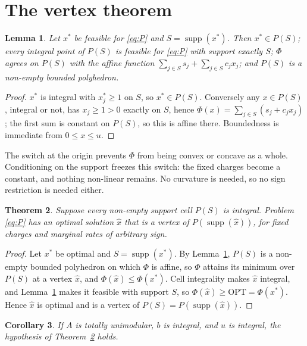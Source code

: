 \documentclass[3p,11pt]{elsarticle}
\newtheorem{theorem}{Theorem}
\newtheorem{lemma}[theorem]{Lemma}
\newtheorem{corollary}[theorem]{Corollary}
\theoremstyle{remark}
\theoremstyle{definition}
\newcommand{\supp}{\operatorname{supp}}
\newcommand{\OPT}{\mathrm{OPT}}
\begin{document}
\section{The vertex theorem}

\begin{lemma}\label{lem:cell}
Let $x^{*}$ be feasible for \eqref{eq:P} and $S=\supp(x^{*})$. Then $x^{*}\in P(S)$;
every integral point of $P(S)$ is feasible for \eqref{eq:P} with support exactly $S$;
$\Phi$ agrees on $P(S)$ with the affine function $\sum_{j\in S}s_j+\sum_{j\in S}c_jx_j$;
and $P(S)$ is a non-empty bounded polyhedron.
\end{lemma}

\begin{proof}
$x^{*}$ is integral with $x^{*}_j\ge1$ on $S$, so $x^{*}\in P(S)$. Conversely any
$x\in P(S)$, integral or not, has $x_j\ge1>0$ exactly on $S$, hence
$\Phi(x)=\sum_{j\in S}(s_j+c_jx_j)$; the first sum is constant on $P(S)$, so this is
affine there. Boundedness is immediate from $0\le x\le u$.
\end{proof}

The switch at the origin prevents $\Phi$ from being convex or concave as a whole.
Conditioning on the support freezes this switch: the fixed charges become a constant,
and nothing non-linear remains. No curvature is needed, so no sign
restriction is needed either.

\begin{theorem}\label{thm:main}
Suppose every non-empty support cell $P(S)$ is integral. Problem \eqref{eq:P} has an
optimal solution $\hat x$ that is a vertex of $P(\supp(\hat x))$, for fixed charges and
marginal rates of arbitrary sign.
\end{theorem}

\begin{proof}
Let $x^{*}$ be optimal and $S=\supp(x^{*})$. By Lemma~\ref{lem:cell}, $P(S)$ is a
non-empty bounded polyhedron on which $\Phi$ is affine, so $\Phi$ attains its minimum
over $P(S)$ at a vertex $\hat x$, and $\Phi(\hat x)\le\Phi(x^{*})$. Cell integrality
makes $\hat x$ integral, and Lemma~\ref{lem:cell} makes it feasible with support $S$, so
$\Phi(\hat x)\ge\OPT=\Phi(x^{*})$. Hence $\hat x$ is optimal and is a vertex of
$P(S)=P(\supp(\hat x))$.
\end{proof}

\begin{corollary}\label{cor:tu}
If $A$ is totally unimodular, $b$ is integral, and $u$ is integral, the hypothesis of
Theorem~\ref{thm:main} holds.
\end{corollary}
\end{document}
